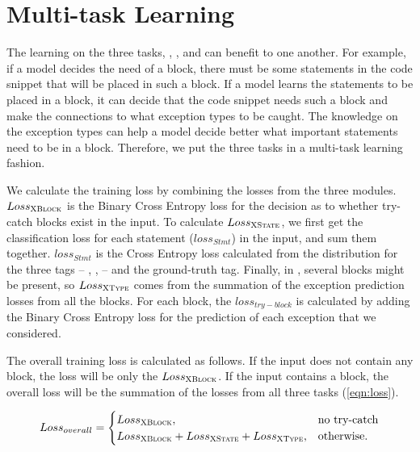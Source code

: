 \section{Multi-task Learning}
\label{sec:multitasking}

The learning on the three tasks, {\xblock}, {\xstate}, and {\xtype}
can benefit to one another. For example, if a model decides the need
of a  block, there must be some statements in the code
snippet that will be placed in such a block. If a model learns the
statements to be placed in a  block, it can decide
that the code snippet needs such a block and make the connections to
what exception types to be caught. The knowledge on the exception
types can help a model decide better what important statements need to
be in a  block. Therefore, we put the three tasks
in a multi-task learning fashion.


We calculate the training loss by combining the losses from the three
modules. $Loss_{{\textsc{XBlock}}}$ is the Binary Cross Entropy loss for the
decision as to whether try-catch blocks exist in the input. To
calculate $Loss_{{\textsc{XState}}}$, we first get the classification loss for
each statement ($loss_{Stmt}$) in the input, and sum them
together. $loss_{Stmt}$ is the Cross Entropy loss calculated from the
distribution for the three tags -- , ,
 -- and the ground-truth tag. Finally, in \xtype, several
 blocks might be present, so $Loss_{{\textsc{XType}}}$ comes
from the summation of the exception prediction losses from all the
 blocks. For each  block, the
$loss_{try-block}$ is calculated by adding the Binary Cross Entropy
loss for the prediction of each exception that we considered.

The overall training loss is calculated as follows. If the input does
not contain any  block, the loss will be only the
$Loss_{{\textsc{XBlock}}}$. If the input contains a  block,
the overall loss will be the summation of the losses from all
three tasks (\ref{eqn:loss}).

\begin{equation}
\label{eqn:loss}
Loss_{overall} =
\begin{cases}
Loss_{{\textsc{XBlock}}},  & \text{no try-catch}\\
Loss_{{\textsc{XBlock}}} + Loss_{{\textsc{XState}}} + Loss_{{\textsc{XType}}}, &\text{otherwise.}
\end{cases}
\end{equation}

